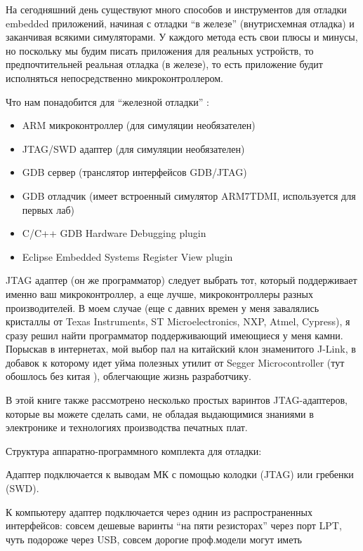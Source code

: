 \label{labdebinst}


 На сегодняшний день существуют много способов и инструментов для отладки
 embedded приложений, начиная с отладки “в железе” (внутрисхемная отладка)  и
 заканчивая всякими симуляторами. У каждого метода есть свои плюсы и минусы, но
 поскольку мы будим писать приложения для реальных устройств, то
 предпочтительней реальная отладка (в железе), то есть приложение будит
 исполняться непосредственно микроконтроллером.
 
Что нам понадобится для “железной отладки” :

\begin{itemize}
  \item 
ARM микроконтроллер (для симуляции необязателен)
  \item 
JTAG/SWD адаптер (для симуляции необязателен)
  \item 
GDB сервер (транслятор интерфейсов GDB/JTAG)
  \item 
GDB отладчик (имеет встроенный симулятор ARM7TDMI, используется для первых лаб) 
  \item 
C/C++ GDB Hardware Debugging plugin
  \item 
Eclipse Embedded Systems Register View plugin
\end{itemize}

JTAG адаптер (он же программатор) следует выбрать тот, который поддерживает
именно ваш микроконтроллер, а еще лучше, микроконтроллеры разных производителей. В моем
случае (еще с давних времен у меня завалялись кристаллы от Texas Instruments, ST
Microelectronics, NXP, Atmel, Cypress), я сразу решил найти программатор
поддерживающий имеющиеся у меня камни. Порыскав в интернетах, мой выбор пал на
китайский клон знаменитого J-Link, в добавок к которому идет уйма полезных
утилит от Segger Microcontroller (тут обошлось без китая \smiley), облегчающие
жизнь разработчику.

В этой книге также рассмотрено несколько простых варинтов JTAG-адаптеров,
которые вы можете сделать сами, не обладая выдающимися знаниями в электронике
и технологиях производства печатных плат.

\bigskip
Структура аппаратно-программного комплекта для отладки:


Адаптер подключается к выводам МК с помощью колодки (JTAG) или гребенки (SWD).

К компьютеру адаптер подключается через однин из распространенных интерфейсов:
совсем дешевые варинты ``на пяти резисторах'' через порт LPT, чуть подороже
через USB, совсем дорогие проф.модели могут иметь 
